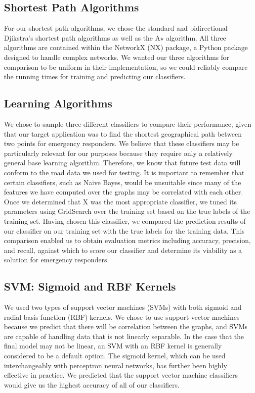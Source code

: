 \documentclass{article}
\begin{document}
\subsection{Shortest Path Algorithms}

For our shortest path algorithms, we chose the standard and bidirectional Djikstra's shortest path algorithms as well as the A$\star$ algorithm. All three algorithms are contained within the NetworkX (NX) package, a Python package designed to handle complex networks. We wanted our three algorithms for comparison to be uniform in their implementation, so we could reliably compare the running times for training and predicting our classifiers.

\subsection{Learning Algorithms} 

We  chose to sample three different classifiers to compare their performance, given that our target application was to find the shortest geographical path between two points for emergency responders. We believe that these classifiers may be particularly relevant for our purposes because they require only a relatively general base learning algorithm. Therefore, we know that future test data will conform to the road data we used for testing. It is important to remember that certain classifiers, such as Naive Bayes, would be unsuitable since many of the features we have computed over the graphs may be correlated with each other. Once we determined that X was the most appropriate classifier, we tuned its parameters using GridSearch over the training set based on the true labels of the training set. Having chosen this classifier, we compared the prediction results of our classifier on our training set with the true labels for the training data. This comparison enabled us to obtain evaluation metrics including accuracy, precision, and recall, against which to score our classifier and determine its viability as a solution for emergency responders.

\subsection{SVM: Sigmoid and RBF Kernels}

We used two types of support vector machines (SVMs) with both sigmoid and radial basis function (RBF) kernels. We chose to use support vector machines because we predict that there will be correlation between the graphs, and SVMs are capable of handling data that is not linearly separable. In the case that the final model may not be linear, an SVM with an RBF kernel is generally considered to be a default option. The sigmoid kernel, which can be used interchangeably with perceptron neural networks, has further been highly effective in practice. We predicted that the support vector machine classifiers would give us the highest accuracy of all of our classifiers.
\end{document}

